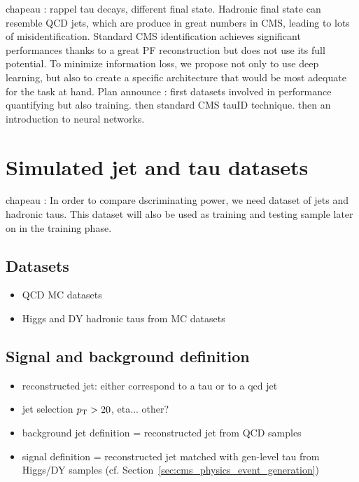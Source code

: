 
chapeau : rappel tau decays, different final state. Hadronic final state can resemble QCD jets, which are produce in great numbers in CMS, leading to lots of misidentification. Standard CMS identification achieves significant performances thanks to a great PF reconstruction but does not use its full potential. To minimize information loss, we propose not only to use deep learning, but also to create a specific architecture that would be most adequate for the task at hand. Plan announce : first datasets involved in performance quantifying but also training. then standard CMS tauID technique. then an introduction to neural networks.

\section{Simulated jet and tau datasets}
chapeau : In order to compare dscriminating power, we need dataset of jets and hadronic taus. This dataset will also be used as training and testing sample later on in the training phase.

\subsection{Datasets}

\begin{itemize}
    \item QCD MC datasets
    \item Higgs and DY hadronic taus from MC datasets
\end{itemize}

\subsection{Signal and background definition}

\begin{itemize}
    \item reconstructed jet: either correspond to a tau or to a qcd jet 
    \item jet selection $p_{\mathrm{T}}>20$, eta... other? 
    \item background jet definition = reconstructed jet from QCD samples
    \item signal definition = reconstructed jet matched with gen-level tau from Higgs/DY samples (cf. Section~\ref{sec:cms_physics_event_generation})
\end{itemize}

